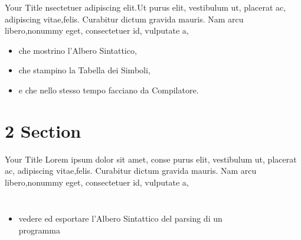 \documentclass[aspectratio  =  169, 15pt]{beamer}
\begin{document}
    
    \begin{frame}{Your Title}
        nsectetuer adipiscing elit.Ut purus elit, vestibulum ut, placerat ac, adipiscing vitae,felis. Curabitur dictum gravida mauris. Nam arcu libero,nonummy eget, consectetuer id, vulputate a,
        
        \begin{itemize}
        	\item che mostrino l'{\color{mauve}Albero Sintattico},
        	\item che stampino la {\color{orange}Tabella dei Simboli},
        	\item e che nello stesso tempo facciano da {\color{blue}Compilatore}.
        \end{itemize}
    \end{frame}
    
    \section{2 Section}
    
    \begin{frame}{Your Title}
        Lorem ipsum dolor sit amet, conse purus elit, vestibulum ut, placerat ac, adipiscing vitae,felis. Curabitur dictum gravida mauris. Nam arcu libero,nonummy eget, consectetuer id, vulputate a,
        \begin{columns}[t]
            \begin{itemize}
            	\item vedere ed esportare l'{\color{yellow}Albero Sintattico} del parsing di un programma
            \end{itemize}
            \vspace*{-25pt}
            \begin{figure}[H]
                \centering
                \noindent{}
            \end{figure}
        \end{columns}
    \end{frame}
    
\end{document}
